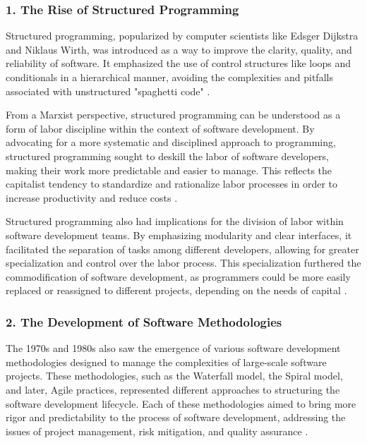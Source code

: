 \begin{refsection}
\begin{multicols}{2}
{\subsubsection*{1. The Rise of Structured Programming}

Structured programming, popularized by computer scientists like Edsger Dijkstra and Niklaus Wirth, was introduced as a way to improve the clarity, quality, and reliability of software. It emphasized the use of control structures like loops and conditionals in a hierarchical manner, avoiding the complexities and pitfalls associated with unstructured "spaghetti code" \cite{dijkstra1972structured, wirth1971programming}.

From a Marxist perspective, structured programming can be understood as a form of labor discipline within the context of software development. By advocating for a more systematic and disciplined approach to programming, structured programming sought to deskill the labor of software developers, making their work more predictable and easier to manage. This reflects the capitalist tendency to standardize and rationalize labor processes in order to increase productivity and reduce costs \cite{braverman1974labor}.

Structured programming also had implications for the division of labor within software development teams. By emphasizing modularity and clear interfaces, it facilitated the separation of tasks among different developers, allowing for greater specialization and control over the labor process. This specialization furthered the commodification of software development, as programmers could be more easily replaced or reassigned to different projects, depending on the needs of capital \cite{marx1867capital}.

\subsubsection*{2. The Development of Software Methodologies}

The 1970s and 1980s also saw the emergence of various software development methodologies designed to manage the complexities of large-scale software projects. These methodologies, such as the Waterfall model, the Spiral model, and later, Agile practices, represented different approaches to structuring the software development lifecycle. Each of these methodologies aimed to bring more rigor and predictability to the process of software development, addressing the issues of project management, risk mitigation, and quality assurance \cite{royce1970waterfall, boehm1988spiral}.

}
\end{multicols}
\end{refsection}
